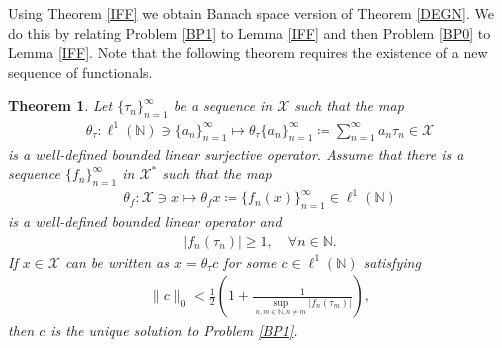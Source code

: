 \documentclass{amsart}
\newtheorem{theorem}{Theorem}[section]
\begin{document}
Using Theorem \ref{IFF} we obtain Banach space version of Theorem \ref{DEGN}. We do this  by relating Problem \ref{BP1} to Lemma \ref{IFF} and then Problem \ref{BP0} to Lemma \ref{IFF}. Note that the following theorem requires the existence of a new sequence of functionals.
\begin{theorem}\label{TDP}
	Let $\{\tau_n \}_{n=1}^\infty$ be a sequence in  $\mathcal{X}$ such that the map 
	\begin{align*}
		\theta_\tau:\ell^1(\mathbb{N})\ni \{a_n \}_{n=1}^\infty\mapsto \theta_\tau \{a_n \}_{n=1}^\infty\coloneqq \sum_{n=1}^{\infty}a_n\tau_n \in \mathcal{X} 
	\end{align*}
	is a well-defined bounded linear surjective operator. Assume that there is a sequence $\{f_n \}_{n =1}^\infty$ in $\mathcal{X}^*$ such that the map 
	\begin{align}\label{L}
		\theta_f: \mathcal{X} \ni x \mapsto \theta_fx\coloneqq \{f_n(x) \}_{n =1}^\infty \in \ell^1(\mathbb{N})
	\end{align}
	is a well-defined bounded linear operator and 
	 \begin{align}\label{N}
	|f_n(\tau_n)|\geq1, \quad \forall n \in \mathbb{N}.
\end{align}
	If $x \in \mathcal{X}$ can be written as  $	x=\theta_\tau c$ for some  $c \in \ell^1(\mathbb{N})$ satisfying 
\begin{align}\label{I}
\|c\|_0<\frac{1}{2}\left(1+\frac{1}{\displaystyle\sup_{n, m \in \mathbb{N}, n \neq m}| f_n(\tau_m)|}\right),	
\end{align}
then $c$ is the unique solution to Problem \ref{BP1}.
\end{theorem}
\end{document}
